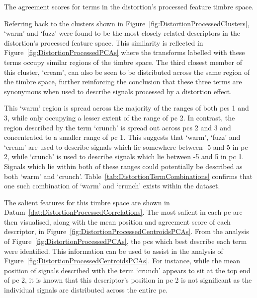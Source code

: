 			\begin{table}[h!]
				\centering
				
				\caption{The agreement scores for terms in the 
					 distortion's processed feature timbre space.}
				\label{tab:DistortionProcessedAgreements}
			\end{table}

			Referring back to the clusters shown in Figure~\ref{fig:DistortionProcessedClusters}, `warm' and
			`fuzz' were found to be the most closely related descriptors in the distortion's processed feature
			space. This similarity is reflected in Figure~\ref{fig:DistortionProcessedPCAs} where the
			transforms labelled with these terms occupy similar regions of the timbre space. The third closest
			member of this cluster, `cream', can also be seen to be distributed across the same region of the
			timbre space, further reinforcing the conclusion that these three terms are synonymous when used to
			describe signals processed by a distortion effect.

			This `warm' region is spread across the majority of the ranges of both \acrshort{pc}s 1 and 3,
			while only occupying a lesser extent of the range of \acrshort{pc} 2. In contrast, the region
			described by the term `crunch' is spread out across \acrshort{pc}s 2 and 3 and concentrated to a
			smaller range of \acrshort{pc} 1. This suggests that `warm', `fuzz' and `cream' are used to
			describe signals which lie somewhere between -5 and 5 in \acrshort{pc} 2, while `crunch' is used to
			describe signals which lie between -5 and 5 in \acrshort{pc} 1.  Signals which lie within both of
			these ranges could potentially be described as both `warm' and `crunch'.
			Table~\ref{tab:DistortionTermCombinations} confirms that one such combination of `warm' and
			`crunch' exists within the dataset.

			The salient features for this timbre space are shown in
			Datum~\ref{dat:DistortionProcessedCorrelations}. The most salient in each \acrshort{pc} are then
			visualised, along with the mean position and agreement score of each descriptor, in
			Figure~\ref{fig:DistortionProcessedCentroidsPCAs}. From the analysis of
			Figure~\ref{fig:DistortionProcessedPCAs}, the \acrshort{pc}s which best describe each term were
			identified. This information can be used to assist in the analysis of
			Figure~\ref{fig:DistortionProcessedCentroidsPCAs}. For instance, while the mean position of signals
			described with the term `crunch' appears to sit at the top end of \acrshort{pc} 2, it is known that
			this descriptor's position in \acrshort{pc} 2 is not significant as the individual signals are
			distributed across the entire \acrshort{pc}.

